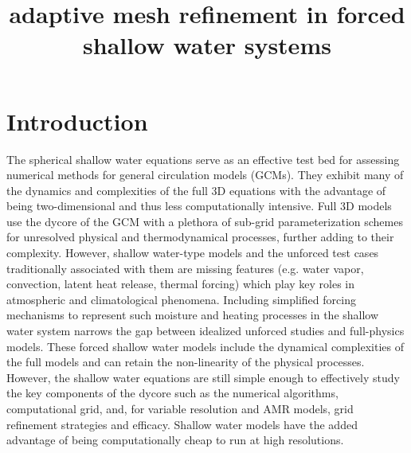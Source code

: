 \documentclass{ametsoc}
\title{adaptive mesh refinement in forced shallow water systems}
\affiliation{}
\begin{document}
\maketitle


%



\section{Introduction}
The spherical shallow water equations serve as an effective test bed for 
assessing numerical methods for general circulation models (GCMs). They 
exhibit many of the dynamics and complexities of the full 3D equations with 
the advantage of being two-dimensional and thus less computationally intensive.  
Full 3D models use the dycore of the GCM with
 a plethora of sub-grid parameterization 
schemes for unresolved physical and thermodynamical processes, further 
adding to their complexity.  However, shallow water-type models and 
the unforced test cases traditionally associated with them \citep{Williamson:1992kx}
are missing features (e.g. water vapor, convection, latent heat release, 
thermal forcing) which play key roles in atmospheric and 
climatological phenomena. Including simplified forcing mechanisms to represent 
such moisture and heating
processes in the shallow 
water system narrows the gap between idealized unforced studies 
and full-physics models. These forced shallow water 
models include the dynamical complexities of the full models and can retain
the non-linearity of the physical processes.  However,
the shallow water equations are still simple enough to effectively study
the key components of the dycore such as the numerical algorithms,
computational grid, and, for variable resolution and AMR models, grid refinement
strategies and efficacy. Shallow water models have the added advantage of being
computationally cheap to run at high resolutions.
\end{document}
